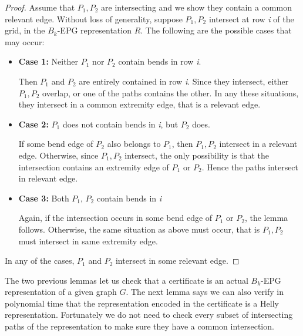 \documentclass[
submission
]{dmtcs-episciences}
\begin{document}
\begin{proof}
 Assume that $P_1, P_2$ are intersecting and we show they contain a common relevant edge. Without loss of generality, suppose $P_1, P_2$ intersect at row \textit{i} of the grid, in the  $B_k$-EPG representation $R$. The following are the possible cases that may occur:

\begin{itemize}
\item \textbf{Case 1:} Neither $P_1$ nor $P_2$ contain bends in row \textit{i}. 

Then $P_1$ and $ P_2$  are entirely contained in row \textit{i}. Since they intersect, either $P_1, P_2$  overlap, or one of the paths contains the other. In any these situations, they intersect in a common extremity edge, that is a relevant edge.

\item \textbf{Case 2:} $P_1$ does not contain bends in \textit{i}, but $ P_2$ does.

If some bend edge of $P_2$ also belongs to $P_1$, then $P_1, P_2$  intersect in  a relevant edge. Otherwise, since $P_1, P_2$  intersect, the only possibility is that the intersection contains an extremity edge of $P_1$ or $ P_2$. Hence the paths intersect in relevant edge.  

\item \textbf{Case 3:} Both $P_1$,  $P_2$ contain bends in \textit{i}

Again, if the intersection occurs in some bend edge of $P_1$  or $P_2$, the lemma follows. Otherwise, the same situation as above must occur, that is $P_1, P_2$  must intersect in same extremity edge.
 
\end{itemize}
In any of the cases, $P_1$ and $P_2$ intersect in some relevant edge.
 \end{proof}



The two previous lemmas let us check that a certificate is an actual $B_k$-EPG representation of a given graph $G$.  The next lemma says we can also verify in polynomial time that the representation encoded in the certificate is a Helly representation. Fortunately we do not need to check every subset of intersecting paths  of the representation to make sure they have a common intersection. 

\end{document}
